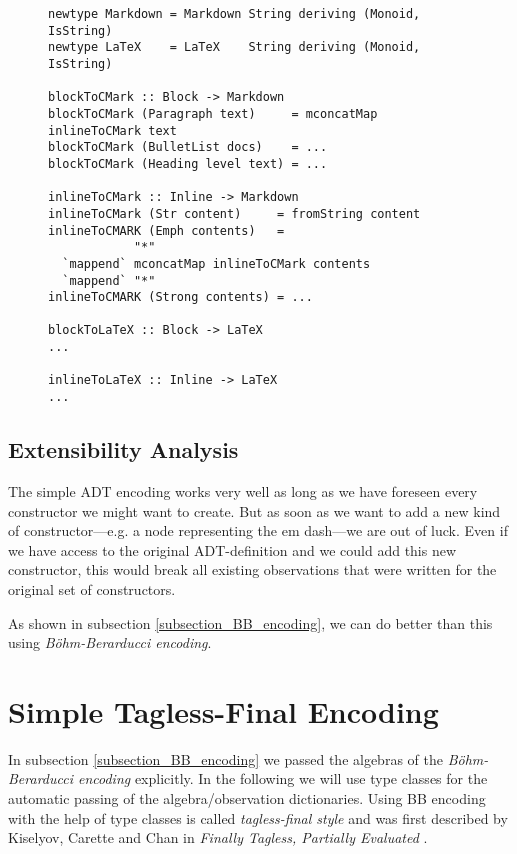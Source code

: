 \begin{figure}
\begin{lstlisting}
newtype Markdown = Markdown String deriving (Monoid, IsString)
newtype LaTeX    = LaTeX    String deriving (Monoid, IsString)

blockToCMark :: Block -> Markdown
blockToCMark (Paragraph text)     = mconcatMap inlineToCMark text
blockToCMark (BulletList docs)    = ...
blockToCMark (Heading level text) = ...

inlineToCMark :: Inline -> Markdown
inlineToCMark (Str content)     = fromString content
inlineToCMARK (Emph contents)   =
            "*"
  `mappend` mconcatMap inlineToCMark contents
  `mappend` "*"
inlineToCMARK (Strong contents) = ...

blockToLaTeX :: Block -> LaTeX
...

inlineToLaTeX :: Inline -> LaTeX
...
\end{lstlisting}
\end{figure}

\subsection{Extensibility Analysis}

The simple ADT encoding works very well as long as we have foreseen every
constructor we might want to create. But as soon as we want to add a new kind of
constructor—e.g. a node representing the em dash—we are out of luck. Even if we
have access to the original ADT-definition and we could add this new
constructor, this would break all existing observations that were written for
the original set of constructors.

As shown in subsection \ref{subsection_BB_encoding}, we can do better than this
using \emph{Böhm-Berarducci encoding}.

\clearpage

\section{Simple Tagless-Final Encoding} \label{section_tagless-final}

In subsection \ref{subsection_BB_encoding} we passed the algebras of the
\emph{Böhm-Berarducci encoding} explicitly. In the following we will use type
classes for the automatic passing of the algebra/observation dictionaries. Using
BB encoding with the help of type classes is called \emph{tagless-final style}
and was first described by Kiselyov, Carette and Chan in \emph{Finally Tagless,
  Partially Evaluated} \cite{finally-tagless}.


